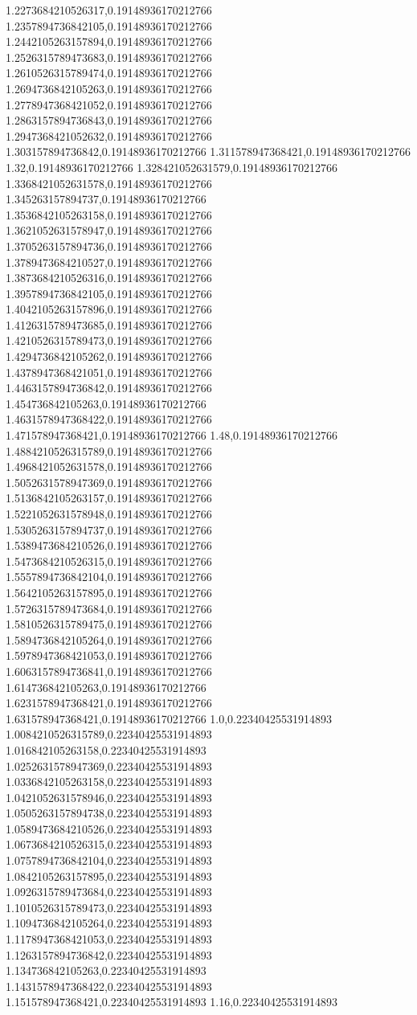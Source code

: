 1.2273684210526317,0.19148936170212766
1.2357894736842105,0.19148936170212766
1.2442105263157894,0.19148936170212766
1.2526315789473683,0.19148936170212766
1.2610526315789474,0.19148936170212766
1.2694736842105263,0.19148936170212766
1.2778947368421052,0.19148936170212766
1.2863157894736843,0.19148936170212766
1.2947368421052632,0.19148936170212766
1.303157894736842,0.19148936170212766
1.311578947368421,0.19148936170212766
1.32,0.19148936170212766
1.328421052631579,0.19148936170212766
1.3368421052631578,0.19148936170212766
1.345263157894737,0.19148936170212766
1.3536842105263158,0.19148936170212766
1.3621052631578947,0.19148936170212766
1.3705263157894736,0.19148936170212766
1.3789473684210527,0.19148936170212766
1.3873684210526316,0.19148936170212766
1.3957894736842105,0.19148936170212766
1.4042105263157896,0.19148936170212766
1.4126315789473685,0.19148936170212766
1.4210526315789473,0.19148936170212766
1.4294736842105262,0.19148936170212766
1.4378947368421051,0.19148936170212766
1.4463157894736842,0.19148936170212766
1.454736842105263,0.19148936170212766
1.4631578947368422,0.19148936170212766
1.471578947368421,0.19148936170212766
1.48,0.19148936170212766
1.4884210526315789,0.19148936170212766
1.4968421052631578,0.19148936170212766
1.5052631578947369,0.19148936170212766
1.5136842105263157,0.19148936170212766
1.5221052631578948,0.19148936170212766
1.5305263157894737,0.19148936170212766
1.5389473684210526,0.19148936170212766
1.5473684210526315,0.19148936170212766
1.5557894736842104,0.19148936170212766
1.5642105263157895,0.19148936170212766
1.5726315789473684,0.19148936170212766
1.5810526315789475,0.19148936170212766
1.5894736842105264,0.19148936170212766
1.5978947368421053,0.19148936170212766
1.6063157894736841,0.19148936170212766
1.614736842105263,0.19148936170212766
1.6231578947368421,0.19148936170212766
1.631578947368421,0.19148936170212766
1.0,0.22340425531914893
1.0084210526315789,0.22340425531914893
1.016842105263158,0.22340425531914893
1.0252631578947369,0.22340425531914893
1.0336842105263158,0.22340425531914893
1.0421052631578946,0.22340425531914893
1.0505263157894738,0.22340425531914893
1.0589473684210526,0.22340425531914893
1.0673684210526315,0.22340425531914893
1.0757894736842104,0.22340425531914893
1.0842105263157895,0.22340425531914893
1.0926315789473684,0.22340425531914893
1.1010526315789473,0.22340425531914893
1.1094736842105264,0.22340425531914893
1.1178947368421053,0.22340425531914893
1.1263157894736842,0.22340425531914893
1.134736842105263,0.22340425531914893
1.1431578947368422,0.22340425531914893
1.151578947368421,0.22340425531914893
1.16,0.22340425531914893
